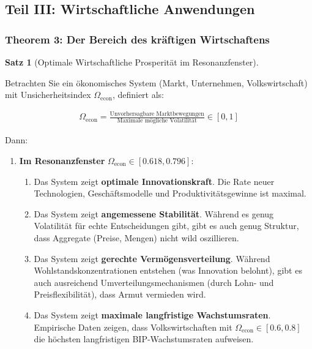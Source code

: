 \documentclass[a4paper,12pt,twoside]{report}
\theoremstyle{definition}
\newtheorem{satz}{Satz}
\begin{document}
\subsection{Teil III: Wirtschaftliche Anwendungen}

\subsubsection*{Theorem 3: Der Bereich des kräftigen Wirtschaftens}

\begin{satz}[Optimale Wirtschaftliche Prosperität im Resonanzfenster]
\label{satz:economic_flourishing}

Betrachten Sie ein ökonomisches System (Markt, Unternehmen, Volkswirtschaft) mit Unsicherheitsindex $\Omega_{\text{econ}}$, definiert als:

\begin{align}
\Omega_{\text{econ}} = \frac{\text{Unvorhersagbare Marktbewegungen}}{\text{Maximale mögliche Volatilität}} \in [0, 1]
\end{align}

Dann:

\begin{enumerate}
	\item \textbf{Im Resonanzfenster} $\Omega_{\text{econ}} \in [0.618, 0.796]$:
	
	\begin{enumerate}
		\item Das System zeigt \textbf{optimale Innovationskraft}. Die Rate neuer Technologien, Geschäftsmodelle und Produktivitätsgewinne ist maximal.
		
		\item Das System zeigt \textbf{angemessene Stabilität}. Während es genug Volatilität für echte Entscheidungen gibt, gibt es auch genug Struktur, dass Aggregate (Preise, Mengen) nicht wild oszillieren.
		
		\item Das System zeigt \textbf{gerechte Vermögensverteilung}. Während Wohlstandskonzentrationen entstehen (was Innovation belohnt), gibt es auch ausreichend Umverteilungsmechanismen (durch Lohn- und Preisflexibilität), dass Armut vermieden wird.
		
		\item Das System zeigt \textbf{maximale langfristige Wachstumsraten}. Empirische Daten zeigen, dass Volkswirtschaften mit $\Omega_{\text{econ}} \in [0.6, 0.8]$ die höchsten langfristigen BIP-Wachstumsraten aufweisen.
	\end{enumerate}
	

\end{enumerate}
\end{satz}
\end{document}
